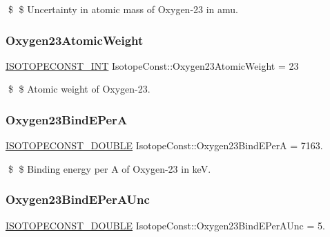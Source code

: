 \$ \$ Uncertainty in atomic mass of Oxygen-\/23 in amu. \mbox{\label{group___isotope_const-_oxygen-_o23_gabc6a519b5585bc595b5082fe4bcd2880}} 
\subsubsection{\texorpdfstring{Oxygen23\+Atomic\+Weight}{Oxygen23AtomicWeight}}
{\footnotesize\ttfamily \mbox{\hyperlink{group___isotope_const-_macros_ga5f18360b3e99483a35c32d789e62621c}{I\+S\+O\+T\+O\+P\+E\+C\+O\+N\+S\+T\+\_\+\+I\+NT}} Isotope\+Const\+::\+Oxygen23\+Atomic\+Weight = 23}

\$ \$ Atomic weight of Oxygen-\/23. \mbox{\label{group___isotope_const-_oxygen-_o23_gaa935503a6174f316d1bd1efae0587abc}} 
\subsubsection{\texorpdfstring{Oxygen23\+Bind\+E\+PerA}{Oxygen23BindEPerA}}
{\footnotesize\ttfamily \mbox{\hyperlink{group___isotope_const-_macros_ga8f45a7272ce02c0b4c65c44636ed719a}{I\+S\+O\+T\+O\+P\+E\+C\+O\+N\+S\+T\+\_\+\+D\+O\+U\+B\+LE}} Isotope\+Const\+::\+Oxygen23\+Bind\+E\+PerA = 7163.}

\$ \$ Binding energy per A of Oxygen-\/23 in keV. \mbox{\label{group___isotope_const-_oxygen-_o23_ga8645949f30e7e1f4326122e893c80314}} 
\subsubsection{\texorpdfstring{Oxygen23\+Bind\+E\+Per\+A\+Unc}{Oxygen23BindEPerAUnc}}
{\footnotesize\ttfamily \mbox{\hyperlink{group___isotope_const-_macros_ga8f45a7272ce02c0b4c65c44636ed719a}{I\+S\+O\+T\+O\+P\+E\+C\+O\+N\+S\+T\+\_\+\+D\+O\+U\+B\+LE}} Isotope\+Const\+::\+Oxygen23\+Bind\+E\+Per\+A\+Unc = 5.}

